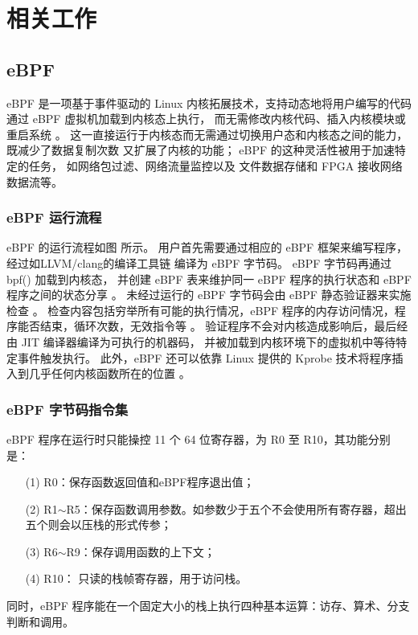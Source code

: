 \section{相关工作}
\label{section:relatedWork}
\subsection{eBPF}
    eBPF 是一项基于事件驱动的 Linux 内核拓展技术，支持动态地将用户编写的代码通过 eBPF 虚拟机加载到内核态上执行，
    而无需修改内核代码、插入内核模块或重启系统
    \cite{sunFindingCorrectnessBugs2024, YIHeCrossContainer, riceLearningEBPFProgramming2023, }。
    这一直接运行于内核态而无需通过切换用户态和内核态之间的能力，既减少了数据复制次数
    又扩展了内核的功能\cite{YIHeCrossContainer, LinuxEbpfProtection}；
    eBPF 的这种灵活性被用于加速特定的任务\cite{HaoValidating}，
    如网络包过滤\cite{10.1145/3371038, TCPdump}、网络流量监控\cite{9110434}以及
    文件数据存储\cite{kernelStorage}和 FPGA 接收网络数据流\cite{258973}等。

    \subsubsection{eBPF 运行流程}
        eBPF 的运行流程如图 所示。
        用户首先需要通过相应的 eBPF 框架来编写程序，经过如LLVM/clang的编译工具链
        编译为 eBPF 字节码\cite{riceLearningEBPFProgramming2023}。
        eBPF 字节码再通过 bpf() 加载到内核态\cite{riceLearningEBPFProgramming2023}，
        并创建 eBPF 表来维护同一 eBPF 程序的执行状态和 eBPF 程序之间的状态分享
        \cite[2]{bensonNetEditOrchestrationPlatform2024}。
        未经过运行的 eBPF 字节码会由 eBPF 静态验证器来实施检查
        \cite{zhengBpftimeUserspaceEBPF2023, HaoValidating}。
        检查内容包括穷举所有可能的执行情况，eBPF 程序的内存访问情况，程序能否结束，循环次数，无效指令等
        \cite{286467, riceLearningEBPFProgramming2023}。
        验证程序不会对内核造成影响后，最后经由 JIT 编译器编译为可执行的机器码\cite{FuzzOnEBPF}，
        并被加载到内核环境下的虚拟机中等待特定事件触发执行\cite{maoMerlinMultitierOptimization2024}。
        此外，eBPF 还可以依靠 Linux 提供的 Kprobe 技术将程序插入到几乎任何内核函数所在的位置
        \cite{riceLearningEBPFProgramming2023}。
    
    \subsubsection{eBPF 字节码指令集}        
        eBPF 程序在运行时只能操控 11 个 64 位寄存器，为 R0 至 R10，其功能分别是：
        \begin{itemize}
            \item[(1)] R0：保存函数返回值和eBPF程序退出值；
            \item[(2)] R1$\sim$R5：保存函数调用参数。如参数少于五个不会使用所有寄存器，超出五个则会以压栈的形式传参；
            \item[(3)] R6$\sim$R9：保存调用函数的上下文；
            \item[(4)] R10： 只读的栈帧寄存器，用于访问栈。
        \end{itemize}
        同时，eBPF 程序能在一个固定大小的栈上执行四种基本运算：访存、算术、分支判断和调用\cite{gershuniSimplePreciseStatic2019}。


